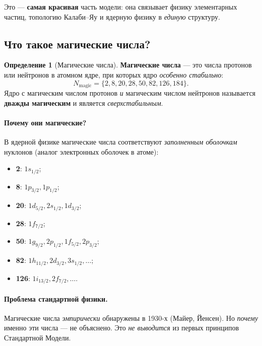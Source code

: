 \documentclass[11pt,a4paper]{article}
\theoremstyle{definition}
\newtheorem{definition}[theorem]{Определение}
\begin{document}
Это — \textbf{самая красивая} часть модели: она связывает 
физику элементарных частиц, топологию Калаби--Яу и ядерную 
физику в \emph{единую} структуру.

\subsection{Что такое магические числа?}
\label{subsec:magic-intro}

\begin{definition}[Магические числа]
\label{def:magic-numbers}
\textbf{Магические числа} — это числа протонов или нейтронов 
в атомном ядре, при которых ядро \emph{особенно стабильно}:
\begin{equation}
    N_{\text{magic}} = \{2, 8, 20, 28, 50, 82, 126, 184\}.
\end{equation}
Ядро с магическим числом протонов \emph{и} магическим числом 
нейтронов называется \textbf{дважды магическим} и является 
\emph{сверхстабильным}.
\end{definition}

\paragraph{Почему они магические?}
В ядерной физике магические числа соответствуют \emph{заполненным 
оболочкам} нуклонов (аналог электронных оболочек в атоме):
\begin{itemize}
    \item \textbf{2}: $1s_{1/2}$;
    \item \textbf{8}: $1p_{3/2}, 1p_{1/2}$;
    \item \textbf{20}: $1d_{5/2}, 2s_{1/2}, 1d_{3/2}$;
    \item \textbf{28}: $1f_{7/2}$;
    \item \textbf{50}: $1g_{9/2}, 2p_{1/2}, 1f_{5/2}, 2p_{3/2}$;
    \item \textbf{82}: $1h_{11/2}, 2d_{3/2}, 3s_{1/2}, \ldots$;
    \item \textbf{126}: $1i_{13/2}, 2f_{7/2}, \ldots$.
\end{itemize}

\paragraph{Проблема стандартной физики.}
Магические числа \emph{эмпирически} обнаружены в 1930-х 
(Майер, Йенсен). Но \emph{почему} именно эти числа — 
не объяснено. Это \emph{не выводится} из первых принципов 
Стандартной Модели.
\end{document}
